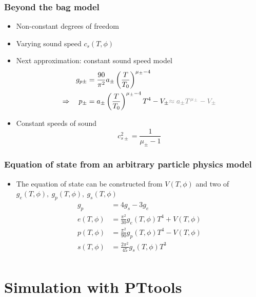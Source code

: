 \begin{frame}
    \frametitle{Beyond the bag model}
    \begin{itemize}
        \item Non-constant degrees of freedom
            \item Varying sound speed $c_s(T,\phi)$
        \item Next approximation: constant sound speed model
        \begin{align}
            g_{p\pm} &= \frac{90}{\pi^2} a_\pm \left( \frac{T}{T_0} \right)^{\mu_\pm - 4} \\
            \Rightarrow \quad
            p_\pm &= a_\pm \left( \frac{T}{T_0} \right)^{\mu_\pm - 4} T^4 - V_\pm {\color{gray} \approx a_\pm T^{\mu_\pm} - V_\pm }
        \end{align}
        \item Constant speeds of sound
        \begin{equation}
            c_{s\pm}^2 = \frac{1}{\mu_\pm - 1}
        \end{equation}
    \end{itemize}
\end{frame}

\begin{frame}
    \frametitle{Equation of state from an arbitrary particle physics model}
    \begin{itemize}
        \item The equation of state can be constructed from $V(T,\phi)$ and two of $g_e(T,\phi), \ g_p(T,\phi), \ g_s(T,\phi)$
        \begin{align}
            g_p &= 4g_s - 3g_e \\
            e(T,\phi) &= \frac{\pi^2}{30} g_e(T,\phi) T^4 + V(T,\phi) \\
            p(T,\phi) &= \frac{\pi^2}{90} g_p(T,\phi) T^4 - V(T,\phi) \\
            s(T,\phi) &= \frac{2\pi^2}{45} g_s(T,\phi) T^3 \\
        \end{align}
    \end{itemize}
\end{frame}

\section{Simulation with PTtools}

